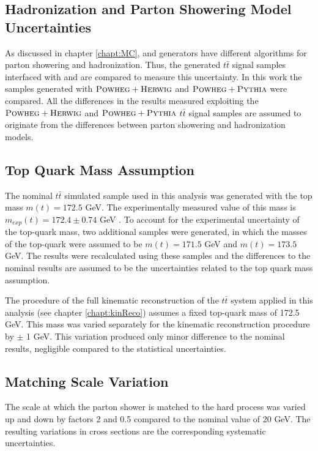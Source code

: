 \subsection{Hadronization and Parton Showering Model Uncertainties}

As discussed in chapter \ref{chapt:MC}, \PYTHIA and \HERWIG generators have different algorithms for parton showering and hadronization.
Thus, the generated $t\bar{t}$ signal samples interfaced with \PYTHIA and \HERWIG are compared to measure this uncertainty. In this work
the samples generated with $\textsc{Powheg}+\textsc{Herwig}$ and $\textsc{Powheg}+\textsc{Pythia}$ were compared. All the differences in the results measured exploiting the
$\textsc{Powheg}+\textsc{Herwig}$ and $\textsc{Powheg}+\textsc{Pythia}$ $t\bar{t}$ signal samples are assumed to originate from the differences between parton showering
and hadronization models.

\subsection{Top Quark Mass Assumption}

The nominal $t\bar{t}$ simulated sample used in this analysis was generated with the top mass $m(t) = 172.5$ GeV. The experimentally measured
value of this mass is $m_{exp}(t) = 172.4 \pm 0.74$ GeV \cite{ATLAS:2014wva}. To account for the experimental uncertainty of the top-quark
mass, two additional samples were generated, in which the masses of the top-quark were assumed to be $m(t) = 171.5$ GeV and
$m(t) = 173.5$ GeV. The results were recalculated using these samples and the differences to the nominal results are assumed to
be the uncertainties related to the top quark mass assumption.

The procedure of the full kinematic reconstruction of the $t\bar{t}$ system applied in this analysis (see chapter \ref{chapt:kinReco})
assumes a fixed top-quark mass of 172.5 GeV. This mass was varied separately for the kinematic reconstruction procedure by $\pm$ 1 GeV. 
This variation produced only minor difference to the nominal results, negligible compared to the statistical uncertainties.

\subsection{Matching Scale Variation}\label{ssec:matchS_sys}

The scale at which the parton shower is matched to the hard process was varied up and down by factors 2 and 0.5 compared to the nominal
value of 20 GeV. The resulting variations in cross sections are the corresponding systematic uncertainties.

